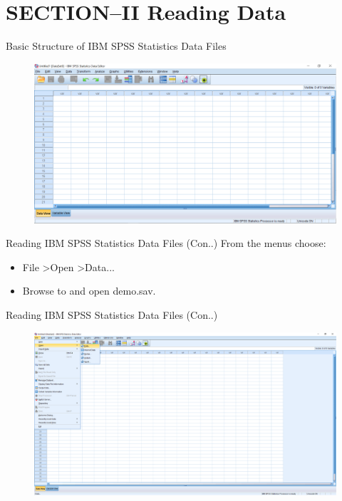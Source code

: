 \section{SECTION--II Reading Data}
\begin{frame}[t]{Basic Structure of IBM SPSS Statistics Data Files}
	\begin{figure}
		\centering
		\includegraphics[width=12cm]{img/data_v1}
	\end{figure}
\end{frame}
\begin{frame}[t]{Reading IBM SPSS Statistics Data Files (Con..)}
	From the menus choose:\\
	\begin{itemize}
		\item File \textgreater Open \textgreater Data...\\
		\item Browse to and open demo.sav.\\
	\end{itemize}	
\end{frame}
\begin{frame}[t]{Reading IBM SPSS Statistics Data Files (Con..)}
	\begin{figure}
		\centering
		\includegraphics[width=12cm]{img/sav_data_1}
	\end{figure}
\end{frame}
